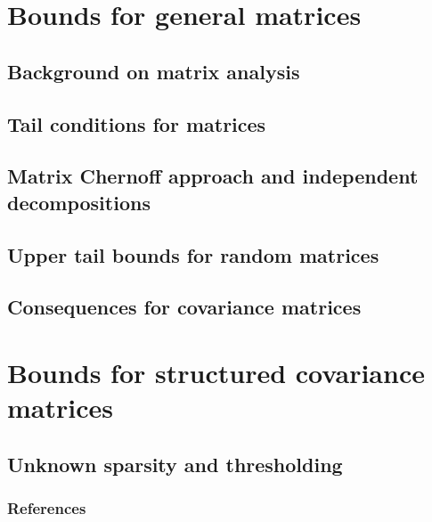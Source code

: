 \documentclass[10pt,handout,english]{beamer}
\begin{document}
\section{Bounds for general matrices}
\subsection{Background on matrix analysis}


\subsection{Tail conditions for matrices}


\subsection{Matrix Chernoff approach and independent decompositions}


\subsection{Upper tail bounds for random matrices}


\subsection{Consequences for covariance matrices}

\section{Bounds for structured covariance matrices}
\subsection{Unknown sparsity and thresholding}

\begin{frame}[allowframebreaks]
\frametitle{References}


\end{frame}
\end{document}
